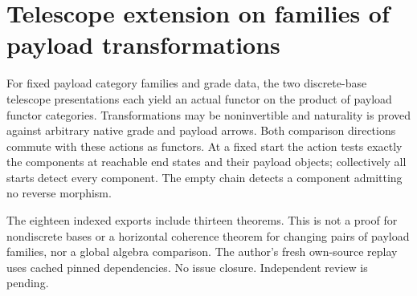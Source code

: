 \documentclass{article}
\begin{document}
\section*{Telescope extension on families of payload transformations}
For fixed payload category families and grade data, the two discrete-base telescope presentations each yield an actual functor on the product of payload functor categories. Transformations may be noninvertible and naturality is proved against arbitrary native grade and payload arrows. Both comparison directions commute with these actions as functors. At a fixed start the action tests exactly the components at reachable end states and their payload objects; collectively all starts detect every component. The empty chain detects a component admitting no reverse morphism.
 
The eighteen indexed exports include thirteen theorems. This is not a proof for nondiscrete bases or a horizontal coherence theorem for changing pairs of payload families, nor a global algebra comparison. The author's fresh own-source replay uses cached pinned dependencies. No issue closure. Independent review is pending.
\end{document}
